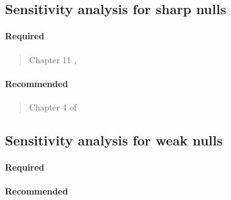 \documentclass[12pt]{article}
\begin{document}
\begin{verse}  \end{verse}

\subsection{Sensitivity analysis for sharp nulls}

\paragraph*{Required}

\begin{verse}
  Chapter 11 , 
\end{verse}

\paragraph*{Recommended}

\begin{verse} Chapter 4 of  \end{verse}

\begin{verse}  \end{verse}

\begin{verse}  \end{verse}

\begin{verse}  \end{verse}

\begin{verse}  \end{verse}

\subsection{Sensitivity analysis for weak nulls}

\paragraph*{Required}

\begin{verse}  \end{verse}

\paragraph*{Recommended}
\end{document}
